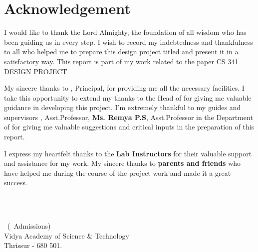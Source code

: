 %
%
%


%
\chapter*{\centering Acknowledgement}
%


\par
\hspace{0.9cm}
\vspace {.2cm}
\par
\hspace{.35cm}I would like to thank the Lord Almighty, the foundation of all wisdom who has been guiding us in every step. I wish to record my indebtedness and thankfulness to all who helped me to prepare this design project titled {\bf \vtitle} and present it in a satisfactory way. This report is part of my work related to the paper CS 341 DESIGN PROJECT 
\vspace{0.2cm}
\par
\hspace{0.35cm}My sincere thanks to {\bf \vprincipal}, Principal, for providing me all the necessary facilities. I take this opportunity to extend my thanks to {\bf \vhod} the Head of {\bf \vdept} for giving me valuable guidance in developing this project. I'm extremely thankful to my guides and supervisors {\bf \vguide}, Asst.Professor, {\bf Ms. Remya P.S}, Asst.Professor in the Department of {\bf \vdept} for giving me valuable suggestions and critical inputs in the preparation of this report. 
\vspace{.2cm}
\par 
\hspace{.35cm}I express my heartfelt thanks to the {\bf Lab Instructors} for their valuable support and assistance for my work. My sincere thanks to {\bf parents and friends} who have helped me during the course of the project work and made it a great success.

\begin{flushright}
{\vauthora}\\
{\vauthorb}\\
{\vauthorc}

\vclass\  (\vadmissionyear\  Admissions)\\
Vidya Academy of Science \& Technology\\
\vdate  \hfill Thrissur - 680 501.
\end{flushright}